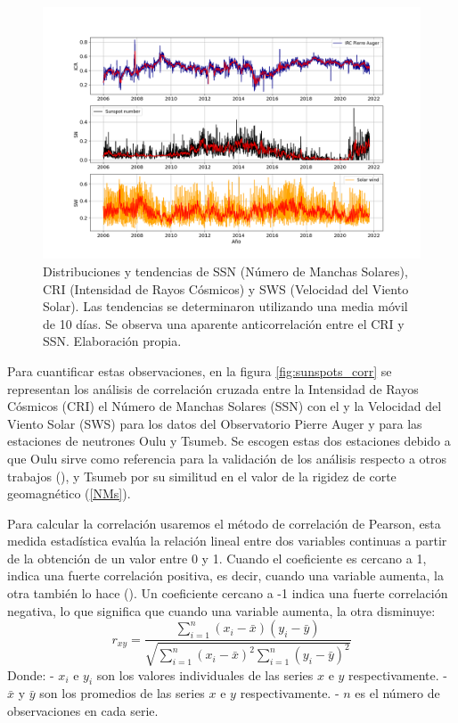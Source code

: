 \begin{figure}
    \includegraphics[width=1.1\linewidth]{Figs/Figr/CRI_SN_SW_over.png}
    \caption{Distribuciones y tendencias de SSN (Número de Manchas Solares), CRI (Intensidad de Rayos Cósmicos) y SWS (Velocidad del Viento Solar). Las tendencias se determinaron utilizando una media móvil de 10 días. Se observa una aparente anticorrelación entre el CRI y SSN. Elaboración propia.}
    \label{fig:CRIvsSN}
\end{figure}
Para cuantificar estas observaciones, en la figura \ref{fig:sunspots_corr} se representan los análisis de correlación cruzada entre la Intensidad de Rayos Cósmicos (CRI) el Número de Manchas Solares (SSN) con el  y la Velocidad del Viento Solar (SWS) para los datos del Observatorio Pierre Auger y para las estaciones de neutrones Oulu y Tsumeb. Se escogen estas dos estaciones debido a que Oulu sirve como referencia para la validación de los análisis respecto a otros trabajos (\cite{Oloketuyi_2020}), y Tsumeb por su similitud en el valor de la rigidez de corte geomagnético (\ref{NMs}).

Para calcular la correlación usaremos el método de correlación de Pearson, esta medida estadística evalúa la relación lineal entre dos variables continuas a partir de la obtención de un valor entre 0 y 1. Cuando el coeficiente es cercano a 1, indica una fuerte correlación positiva, es decir, cuando una variable aumenta, la otra también lo hace (\cite{Davies_2023}). Un coeficiente cercano a -1 indica una fuerte correlación negativa, lo que significa que cuando una variable aumenta, la otra disminuye:
$$ r_{xy} = \frac{\sum_{i=1}^{n} (x_i - \bar{x})(y_i - \bar{y})}{\sqrt{\sum_{i=1}^{n} (x_i - \bar{x})^2 \sum_{i=1}^{n} (y_i - \bar{y})^2}} $$
Donde:
- $x_i$ e $y_i$ son los valores individuales de las series $x$ e $y$ respectivamente.
- $\bar{x}$ y $\bar{y}$ son los promedios de las series $x$ e $y$ respectivamente.
- $n$ es el número de observaciones en cada serie.

